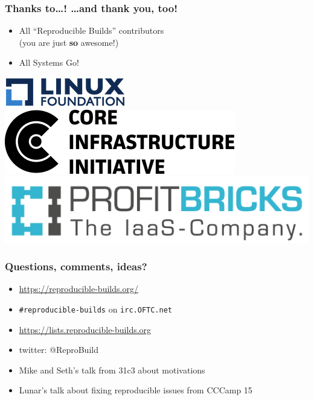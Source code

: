 \documentclass[14pt,aspectratio=169]{beamer}
\newif\ifplacelogo
\begin{document}
\begin{frame}
 \frametitle{Thanks to…! …and thank \textbf{you}, too!}

 \begin{itemize}
  \item
    {All “Reproducible Builds” contributors \\
        {\small (you are just \textbf{so} awesome!)}}
  \item All Systems Go!
\end{itemize}

 \begin{center}
  \includegraphics[height=0.1\paperheight]{images/linux_foundation_logo.png}
  \hspace{0.1\paperwidth}
  \includegraphics[height=0.1\paperheight]{images/cii_logo.png}
  \hspace{0.1\paperwidth}
  \includegraphics[height=0.1\paperheight]{images/profitbricks_logo.png}
 \end{center}

 \vfill
 \begin{center}
 \end{center}
\end{frame}

\placelogofalse

\begin{frame}
 \frametitle{Questions, comments, ideas?}

 \begin{itemize}
  \item \url{https://reproducible-builds.org/}
  \item \texttt{\#reproducible-builds} on \texttt{irc.OFTC.net}
  \item \url{https://lists.reproducible-builds.org}
  \item twitter: @ReproBuild
  \item<2> Mike and Seth's talk from 31c3 about motivations
  \item<2> Lunar's talk about fixing reproducible issues from CCCamp 15
  \end{itemize}
\end{frame}
\end{document}
